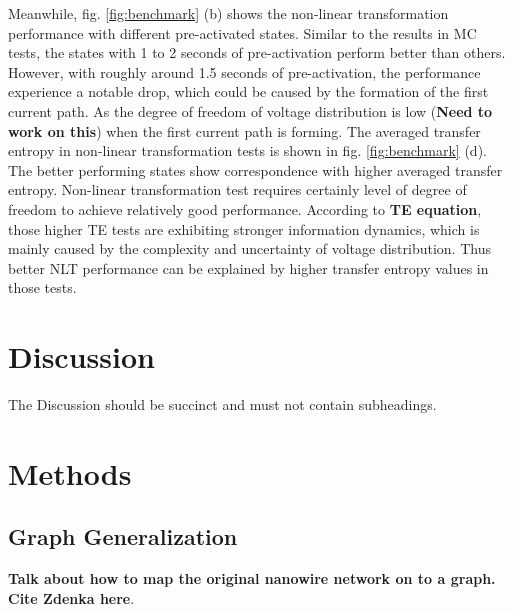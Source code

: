 \documentclass[fleqn,10pt,  amsmath,amssymb,aps]{wlscirep}
\begin{document}
Meanwhile, fig. \ref{fig:benchmark} (b) shows the non-linear transformation performance with different pre-activated states. Similar to the results in MC tests, the states with 1 to 2 seconds of pre-activation perform better than others. However, with roughly around 1.5 seconds of pre-activation, the performance experience a notable drop, which could be caused by the formation of the first current path. As the degree of freedom of voltage distribution is low (\textbf{Need to work on this}) when the first current path is forming. The averaged transfer entropy in non-linear transformation tests is shown in fig. \ref{fig:benchmark} (d). The better performing states show correspondence with higher averaged transfer entropy. Non-linear transformation test requires certainly level of degree of freedom to achieve relatively good performance. According to \textbf{TE equation}, those higher TE tests are exhibiting stronger information dynamics, which is mainly caused by the complexity and uncertainty of voltage distribution. Thus better NLT performance can be explained by higher transfer entropy values in those tests.

\clearpage






\section*{Discussion}

The Discussion should be succinct and must not contain subheadings.

\section*{Methods}

\subsection*{Graph Generalization}

\textbf{Talk about how to map the original nanowire network on to a graph. Cite Zdenka here}.
\end{document}
